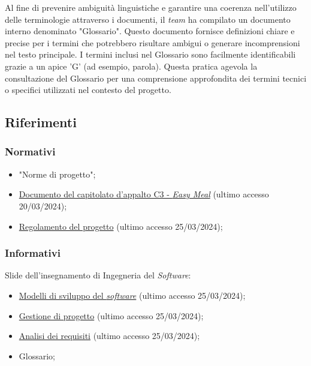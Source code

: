 Al fine di prevenire ambiguità linguistiche e garantire una coerenza nell'utilizzo
delle terminologie attraverso i documenti, il \textit{team} ha compilato un documento
interno denominato "Glossario".
Questo documento fornisce definizioni chiare e precise per i termini che potrebbero
risultare ambigui o generare incomprensioni nel testo principale.
I termini inclusi nel Glossario sono facilmente identificabili grazie a un apice 'G'
(ad esempio, parola\g).
Questa pratica agevola la consultazione del Glossario per una comprensione approfondita
dei termini tecnici o specifici utilizzati nel contesto del progetto.

\subsection{Riferimenti}

\subsubsection{Normativi}
\begin{itemize}
	\item "Norme di progetto";
	\item 	\href{https://www.math.unipd.it/~tullio/IS-1/2023/Progetto/C3.pdf}
	      {Documento del capitolato d'appalto C3 - \textit{Easy Meal}} (ultimo accesso 20/03/2024);
	\item \href{https://www.math.unipd.it/~tullio/IS-1/2023/Dispense/PD2.pdf}
	      {Regolamento del progetto} (ultimo accesso 25/03/2024);
\end{itemize}

\subsubsection{Informativi}

Slide dell'insegnamento di Ingegneria del \textit{Software}:
\begin{itemize}
	\item \href{https://www.math.unipd.it/~tullio/IS-1/2023/Dispense/T3.pdf}
	      {Modelli di sviluppo del \textit{software}} (ultimo accesso 25/03/2024);
	\item \href{https://www.math.unipd.it/~tullio/IS-1/2023/Dispense/T4.pdf}
	      {Gestione di progetto} (ultimo accesso 25/03/2024);
	\item \href{https://www.math.unipd.it/~tullio/IS-1/2023/Dispense/T5.pdf}
	      {Analisi dei requisiti} (ultimo accesso 25/03/2024);
	\item Glossario;
\end{itemize}

